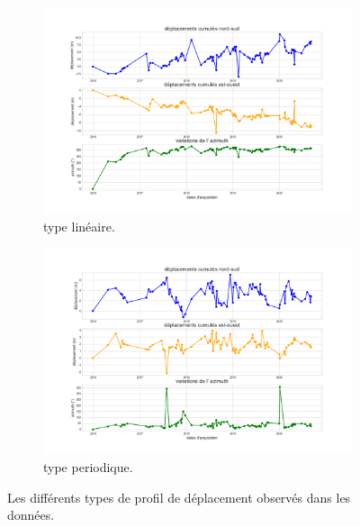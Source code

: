 \documentclass[11pt, openany]{report}
\begin{document}
\begin{figure}[!h]
  \begin{subfigure}[b]{0.5\textwidth}
    \includegraphics[width=\textwidth]{linear.png}
    \caption{type linéaire.}
    \label{fig:f1}
  \end{subfigure}
  \hfill
  \begin{subfigure}[b]{0.5\textwidth}
    \includegraphics[width=\textwidth]{periodical.png}
    \caption{type periodique.}
    \label{fig:f2}
  \end{subfigure}
  \caption{Les différents types de profil de déplacement observés dans les données.}
\end{figure}
\end{document}
